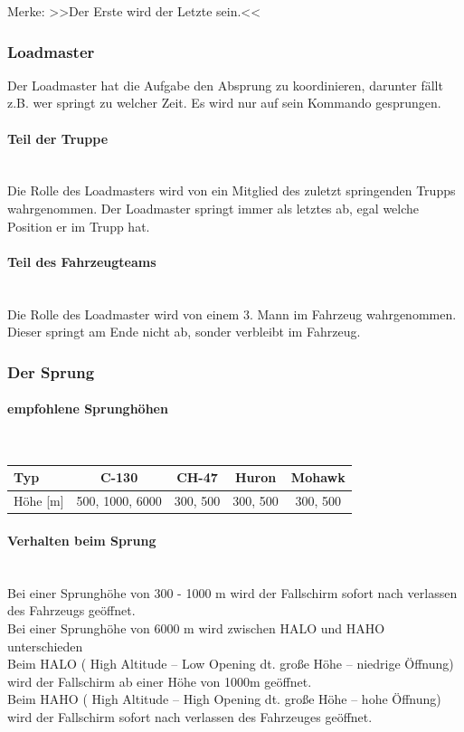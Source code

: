 	\begin{flushright}
		Merke: >>Der Erste wird der Letzte sein.<< 
	\end{flushright}

\subsubsection{Loadmaster}

	Der Loadmaster hat die Aufgabe den Absprung zu koordinieren, darunter fällt z.B. wer springt zu welcher Zeit. Es wird nur auf sein Kommando gesprungen. \\

\paragraph{Teil der Truppe} \ \\
	Die Rolle des Loadmasters wird von ein Mitglied des zuletzt springenden Trupps wahrgenommen. Der Loadmaster springt immer als letztes ab, egal welche Position er im Trupp hat. \\

\paragraph{Teil des Fahrzeugteams} \ \\
	Die Rolle des Loadmaster wird von einem 3. Mann im Fahrzeug wahrgenommen. Dieser springt am Ende nicht ab, sonder verbleibt im Fahrzeug. \\

\subsubsection{Der Sprung}

\paragraph{empfohlene Sprunghöhen} \ \\
\begin{longtable}{|l|c|c|c|c|} \hline
	Typ 			&		C-130 	&	CH-47 	&	Huron		&		 Mohawk	\\ \hline
	Höhe	[m]		&		500, 1000, 6000 & 300, 500	&	300, 500	&		300, 500	\\ \hline
\end{longtable}

\paragraph{Verhalten beim Sprung} \ \\
	Bei einer Sprunghöhe von 300 - 1000 m wird der Fallschirm sofort nach verlassen des Fahrzeugs geöffnet. \\
	Bei einer Sprunghöhe von 6000 m wird zwischen HALO und HAHO unterschieden \\
	Beim HALO ( High Altitude – Low Opening dt. große Höhe – niedrige Öffnung) wird der Fallschirm ab einer Höhe von 1000m geöffnet. \\
	Beim HAHO ( High Altitude – High Opening dt. große Höhe – hohe Öffnung) wird der Fallschirm sofort nach verlassen des Fahrzeuges geöffnet. \\

